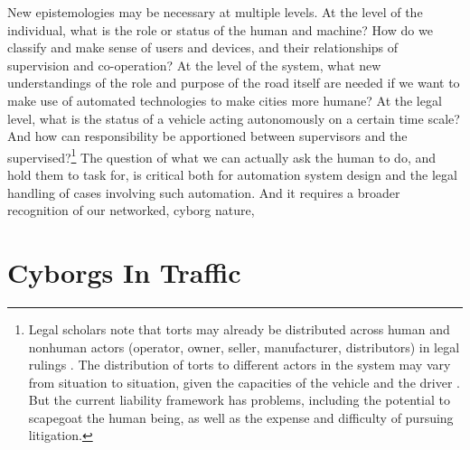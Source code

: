 New epistemologies may be
necessary at multiple levels. At the level of the individual, what is
the role or status of the human and machine? How do we
classify and make sense of users and devices, and their
relationships of supervision and co-operation? At the level of the
system, what new understandings of the role and purpose of the road
itself are needed if we want to make use of automated technologies to
make cities more humane? At the legal level, what is the status of a
vehicle acting autonomously on a certain time scale? And how can
responsibility be apportioned between supervisors and the
supervised?\footnote{Legal scholars note that
torts may already be distributed across human and nonhuman actors
(operator, owner, seller, manufacturer, distributors) in legal
rulings \cite{suemycar} \cite{proximityLiability}. The distribution of
torts to different actors in the system may vary from situation to
situation, given the capacities of 
the vehicle and the driver \cite[p. 267]{suemycar}. But
the current liability framework has problems, including the
potential to scapegoat the human being, as well as the expense and difficulty
of pursuing litigation.}
The question of what we can actually ask the human to do, and hold them to task
for, is critical both for automation system design and the
legal handling of cases involving such automation. And it requires a
broader recognition of our networked, 
cyborg nature,


\section{Cyborgs In Traffic}


